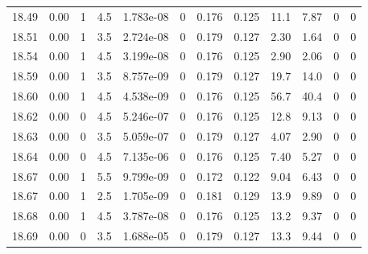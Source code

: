 \documentclass[preview]{standalone}
\begin{document}
{{{{{{{{{{{{{{{{{\begin{tabular}{L{1.2cm}C{1.2cm} C{0.3cm}C{0.5cm} C{1.4cm}C{1.4cm} C{1.4cm}C{1.4cm} C{1.6cm}C{1.6cm} C{1.6cm}C{1.6cm}}
  18.49  &  0.00  & 1     & 4.5 &  1.783e-08  & 0  &  0.176&   0.125& 11.1 & 7.87   &  0 & 0  \\ 
  18.51  &  0.00  & 1     & 3.5 &  2.724e-08  & 0  &  0.179&   0.127& 2.30 & 1.64   &  0 & 0  \\ 
  18.54  &  0.00  & 1     & 4.5 &  3.199e-08  & 0  &  0.176&   0.125& 2.90 & 2.06   &  0 & 0  \\ 
  18.59  &  0.00  & 1     & 3.5 &  8.757e-09  & 0  &  0.179&   0.127& 19.7 & 14.0   &  0 & 0  \\ 
  18.60  &  0.00  & 1     & 4.5 &  4.538e-09  & 0  &  0.176&   0.125& 56.7 & 40.4   &  0 & 0  \\ 
  18.62  &  0.00  & 0     & 4.5 &  5.246e-07  & 0  &  0.176&   0.125& 12.8 & 9.13   &  0 & 0  \\ 
  18.63  &  0.00  & 0     & 3.5 &  5.059e-07  & 0  &  0.179&   0.127& 4.07 & 2.90   &  0 & 0  \\ 
  18.64  &  0.00  & 0     & 4.5 &  7.135e-06  & 0  &  0.176&   0.125& 7.40 & 5.27   &  0 & 0  \\ 
  18.67  &  0.00  & 1     & 5.5 &  9.799e-09  & 0  &  0.172&   0.122& 9.04 & 6.43   &  0 & 0  \\ 
  18.67  &  0.00  & 1     & 2.5 &  1.705e-09  & 0  &  0.181&   0.129& 13.9 & 9.89   &  0 & 0  \\ 
  18.68  &  0.00  & 1     & 4.5 &  3.787e-08  & 0  &  0.176&   0.125& 13.2 & 9.37   &  0 & 0  \\ 
  18.69  &  0.00  & 0     & 3.5 &  1.688e-05  & 0  &  0.179&   0.127& 13.3 & 9.44   &  0 & 0  \\ 
\hline 
\end{tabular} 

}}}}}}}}}}}}}}}}}
\end{document}
